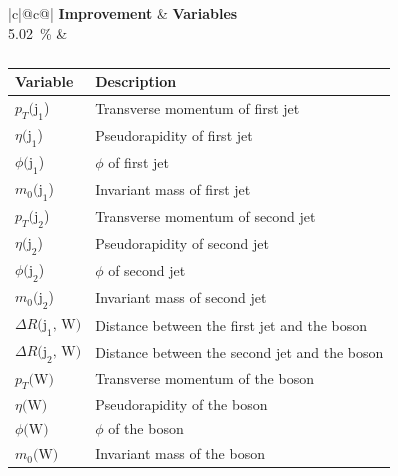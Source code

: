 \begin{table}[h]
    \centering
    \label{tab:app_vars_2}
    \caption{}
    \begin{tabular}{ |c|@{}c@{}| }
        \hline
        \textbf{Improvement} & \textbf{Variables}\\
        \hline
        \SI{5.02}{\%} & 
        \begin{tabular}{ll}
            \hline
            Variable & Description\\
            \hline
            $p_T\text{(j}_\text{1}$) & Transverse momentum of first jet\\
            $\eta\text{(j}_\text{1}$) & Pseudorapidity of first jet\\
            $\phi\text{(j}_\text{1}$) & $\phi$ of first jet\\
            $m_0\text{(j}_\text{1}$) & Invariant mass of first jet\\

            $p_T\text{(j}_\text{2}$) & Transverse momentum of second jet\\
            $\eta\text{(j}_\text{2}$) & Pseudorapidity of second jet\\
            $\phi\text{(j}_\text{2}$) & $\phi$ of second jet\\
            $m_0\text{(j}_\text{2}$) & Invariant mass of second jet\\

            $\Delta R \text{(j}_\text{1}\text{, W)}$ & Distance between the first jet and the \PW boson\\
            $\Delta R \text{(j}_\text{2}\text{, W)}$ & Distance between the second jet and the \PW boson\\

            $p_T\text{(W)}$ & Transverse momentum of the \PW boson\\
            $\eta\text{(W)}$ & Pseudorapidity of the \PW boson\\
            $\phi\text{(W)}$ & $\phi$ of the \PW boson\\
            $m_0\text{(W)}$ & Invariant mass of the \PW boson\\
            \hline
        \end{tabular}\\
        \hline
    \end{tabular}
\end{table}

